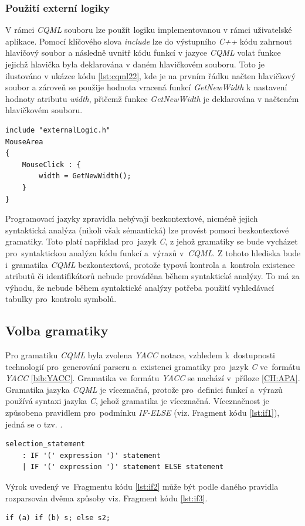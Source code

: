 \documentclass[11pt,twoside,a4paper]{book}
\begin{document}
\subsubsection{Použití externí logiky} %
V rámci \textit{CQML} souboru lze použít logiku implementovanou v rámci uživatelské aplikace. Pomocí klíčového slova \textit{include} lze do výstupního \textit{C++} kódu zahrnout hlavičový soubor a následně uvnitř kódu funkcí v jazyce \textit{CQML} volat funkce jejichž hlavička byla deklarována v daném hlavičkovém souboru. Toto je ilustováno v ukázce kódu \ref{lst:cqml22}, kde je na prvním řádku načten hlavičkový soubor  a zároveň se použije hodnota vracená funkcí \textit{GetNewWidth} k nastavení hodnoty atributu \textit{width}, přičemž funkce \textit{GetNewWidth} je deklarována v načteném hlavičkovém souboru.
\begin{lstlisting}[frame=single,caption=Ukázka použití funkce deklarované v hlavičkovém souboru \textit{CQML}.,label=lst:cqml22]
include "externalLogic.h"
MouseArea
{
	MouseClick : {
		width = GetNewWidth();
	}
}
\end{lstlisting}

Programovací jazyky zpravidla nebývají bezkontextové, nicméně jejich syntaktická analýza (nikoli však sémantická) lze provést pomocí bezkontextové gramatiky. Toto platí například pro~jazyk \textit{C}, z jehož gramatiky se bude vycházet pro~syntaktickou analýzu kódu funkcí a~výrazů v~\textit{CQML}. Z tohoto hlediska bude i~gramatika \textit{CQML} bezkontextová, protože typová kontrola a~kontrola existence atributů či identifikátorů nebude prováděna během syntaktické analýzy. To má za výhodu, že nebude během syntaktické analýzy potřeba použití vyhledávací tabulky pro~kontrolu symbolů.\\
\subsection{Volba gramatiky}
Pro gramatiku \textit{CQML} byla zvolena \textit{YACC} notace, vzhledem k~dostupnosti technologií pro~generování parseru a~existenci gramatiky pro~jazyk \textit{C} ve~formátu \textit{YACC} \ref{bib:YACC}. Gramatika ve~formátu \textit{YACC} se nachází v~příloze \ref{CH:APA}.\\
Gramatika jazyka \textit{CQML} je víceznačná, protože pro~definici funkcí a~výrazů používá syntaxi jazyka \textit{C}, jehož gramatika je víceznačná. Víceznačnost je způsobena pravidlem pro~podmínku \textit{IF-ELSE} (viz. Fragment kódu \ref{lst:if1}), jedná se o tzv. .\\
\begin{lstlisting}[frame=single,caption=Víceznačné \textit{IF-ELSE} pravidlo gramatiky.,label=lst:if1]
selection_statement
	: IF '(' expression ')' statement
	| IF '(' expression ')' statement ELSE statement 
\end{lstlisting}
Výrok uvedený ve~Fragmentu kódu \ref{lst:if2} může být podle daného pravidla rozparsován dvěma způsoby viz. Fragment kódu \ref{lst:if3}.
\begin{lstlisting}[frame=single,caption=Příklad víceznačného výroku \textit{IF}-\textit{ELSE},label=lst:if2]
if (a) if (b) s; else s2;
\end{lstlisting}
\end{document}
